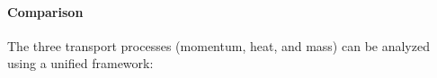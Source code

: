 \paragraph{Comparison}
The three transport processes (momentum, heat, and mass) can be analyzed using a unified framework:
